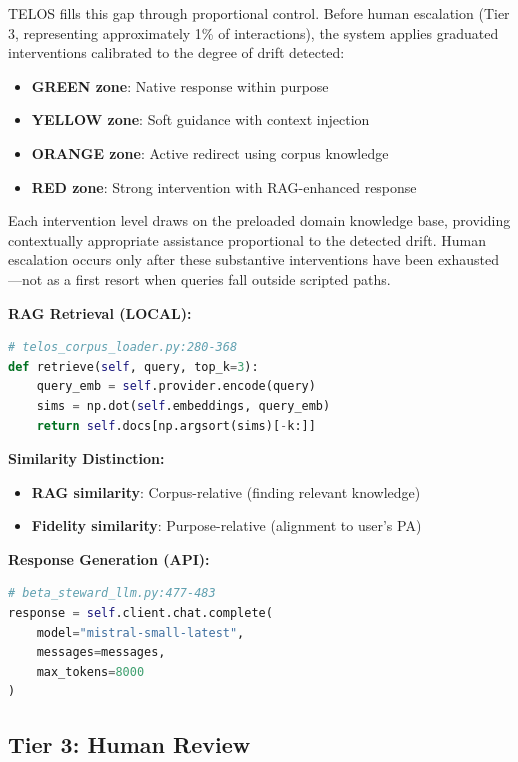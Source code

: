 \documentclass[11pt,twocolumn]{article}
\begin{document}
TELOS fills this gap through proportional control. Before human escalation (Tier 3, representing approximately 1\% of interactions), the system applies graduated interventions calibrated to the degree of drift detected:

\begin{itemize}
    \item \textbf{GREEN zone}: Native response within purpose
    \item \textbf{YELLOW zone}: Soft guidance with context injection
    \item \textbf{ORANGE zone}: Active redirect using corpus knowledge
    \item \textbf{RED zone}: Strong intervention with RAG-enhanced response
\end{itemize}

Each intervention level draws on the preloaded domain knowledge base, providing contextually appropriate assistance proportional to the detected drift. Human escalation occurs only after these substantive interventions have been exhausted---not as a first resort when queries fall outside scripted paths.

\textbf{RAG Retrieval (LOCAL):}
\begin{lstlisting}[language=Python]
# telos_corpus_loader.py:280-368
def retrieve(self, query, top_k=3):
    query_emb = self.provider.encode(query)
    sims = np.dot(self.embeddings, query_emb)
    return self.docs[np.argsort(sims)[-k:]]
\end{lstlisting}

\textbf{Similarity Distinction:}
\begin{itemize}
    \item \textbf{RAG similarity}: Corpus-relative (finding relevant knowledge)
    \item \textbf{Fidelity similarity}: Purpose-relative (alignment to user's PA)
\end{itemize}

\textbf{Response Generation (API):}
\begin{lstlisting}[language=Python]
# beta_steward_llm.py:477-483
response = self.client.chat.complete(
    model="mistral-small-latest",
    messages=messages,
    max_tokens=8000
)
\end{lstlisting}

\subsection{Tier 3: Human Review}
\end{document}

